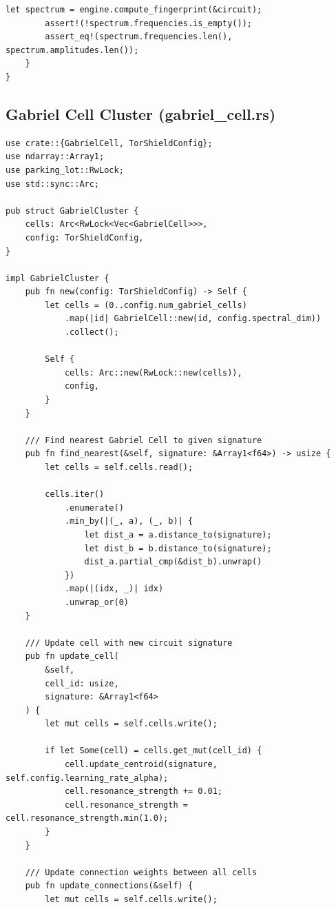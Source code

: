 \documentclass[11pt,a4paper]{article}
\begin{document}
\begin{lstlisting}[style=rust]
        let spectrum = engine.compute_fingerprint(&circuit);
        assert!(!spectrum.frequencies.is_empty());
        assert_eq!(spectrum.frequencies.len(), spectrum.amplitudes.len());
    }
}
\end{lstlisting}

\subsection{Gabriel Cell Cluster (gabriel\_cell.rs)}

\begin{lstlisting}[style=rust]
use crate::{GabrielCell, TorShieldConfig};
use ndarray::Array1;
use parking_lot::RwLock;
use std::sync::Arc;

pub struct GabrielCluster {
    cells: Arc<RwLock<Vec<GabrielCell>>>,
    config: TorShieldConfig,
}

impl GabrielCluster {
    pub fn new(config: TorShieldConfig) -> Self {
        let cells = (0..config.num_gabriel_cells)
            .map(|id| GabrielCell::new(id, config.spectral_dim))
            .collect();
        
        Self {
            cells: Arc::new(RwLock::new(cells)),
            config,
        }
    }
    
    /// Find nearest Gabriel Cell to given signature
    pub fn find_nearest(&self, signature: &Array1<f64>) -> usize {
        let cells = self.cells.read();
        
        cells.iter()
            .enumerate()
            .min_by(|(_, a), (_, b)| {
                let dist_a = a.distance_to(signature);
                let dist_b = b.distance_to(signature);
                dist_a.partial_cmp(&dist_b).unwrap()
            })
            .map(|(idx, _)| idx)
            .unwrap_or(0)
    }
    
    /// Update cell with new circuit signature
    pub fn update_cell(
        &self, 
        cell_id: usize, 
        signature: &Array1<f64>
    ) {
        let mut cells = self.cells.write();
        
        if let Some(cell) = cells.get_mut(cell_id) {
            cell.update_centroid(signature, self.config.learning_rate_alpha);
            cell.resonance_strength += 0.01;
            cell.resonance_strength = cell.resonance_strength.min(1.0);
        }
    }
    
    /// Update connection weights between all cells
    pub fn update_connections(&self) {
        let mut cells = self.cells.write();
        

\end{lstlisting}
\end{document}
